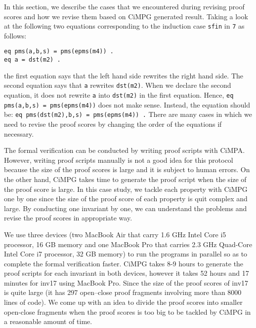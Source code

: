 \documentclass[a4paper,fleqn]{cas-dc}
\begin{document}
In this section, we describe the cases that we encountered during revising proof scores and how we revise them based on CiMPG generated result. Taking a look at the following two equations corresponding to the induction case \verb!sfin! in \verb!7! as follows:
\begin{small}
\begin{verbatim}
eq pms(a,b,s) = pms(epms(m4)) .
eq a = dst(m2) .
\end{verbatim}
\end{small}
the first equation says that the left hand side rewrites the right hand side. The second equation says that \verb!a! rewrites \verb!dst(m2)!. When we declare the second equation, it does not rewrite \verb!a! into \verb!dst(m2)! in the first equation. Hence, \verb!eq pms(a,b,s) = pms(epms(m4))! does not make sense. Instead, the equation should be: \verb!eq pms(dst(m2),b,s) = pms(epms(m4)) .! There are many cases in which we need to revise the proof scores by changing the order of the equations if necessary.

The formal verification can be conducted by writing  proof  scripts  with  CiMPA. However, writing proof scripts manually is not a good idea for this protocol because the size of the proof scores is large and it is subject to human errors. On the other hand, CiMPG takes time to generate the proof script when the size of the proof score is large. In this case study, we tackle each property with
CiMPG one by one since the size of the proof score of each property is quit complex and large. By conducting one invariant by one, we can understand the problems and revise the proof scores in appropriate way. 

We use three devices (two MacBook Air that carry 1.6 GHz Intel Core i5 processor, 16 GB memory and one MacBook Pro that carries 2.3 GHz Quad-Core Intel Core i7 processor, 32 GB memory) to run the programs in parallel so as to complete the formal verification faster. CiMPG takes 8-9 hours to generate the proof scripts for each invariant in both devices, however it takes 52 hours and 17 minutes for inv17 using MacBook Pro. Since the size of the proof scores of inv17 is quite large (it has 297 open–close proof fragments involving more than 8000 lines of code). We come up with an idea to divide the proof scores into smaller  open-close fragments when the proof scores is too big to be tackled by CiMPG in a reasonable amount of time.
\end{document}
